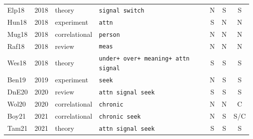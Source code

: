 {\begin{longtable}{@{}lrllccc@{}}
Elp18 & 2018 & theory & \texttt{signal switch} & N & S & S \\
Hun18 & 2018 & experiment & \texttt{attn} & S & N & N \\
Mug18 & 2018 & correlational & \texttt{person} & N & N & N \\
Raf18 & 2018 & review & \texttt{meas} & N & N & N \\
Wes18 & 2018 & theory & \texttt{under+ over+ meaning+ attn signal} & S & S & S \\
Ben19 & 2019 & experiment & \texttt{seek} & N & S & S \\
DnE20 & 2020 & review & \texttt{attn signal seek} & S & S & S \\
Wol20 & 2020 & correlational & \texttt{chronic} & N & N & C \\
Boy21 & 2021 & correlational & \texttt{chronic seek} & N & S & S/C \\
Tam21 & 2021 & theory & \texttt{attn signal seek} & S & S & S \\
\end{longtable}}
